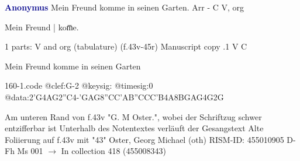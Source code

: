 \documentclass[twocolumn]{book}
\begin{document}
\newline \par \vspace{7pt} \textcolor{darkblue}{\textbf{Anonymus  }}
\newline Mein Freund komme in seinen Garten. Arr - C
\newline V, org
\newline \begin{itshape}[f.43v, at left:] Mein Freund | kom̅e.\end{itshape} 
\newline \textcolor{darkblue}{}  1 parts: V and org (tabulature)  (f.43v-45r)
\newline Manuscript copy
.1  V  C
\newline \begin{footnotesize} Mein Freund komme in seinen Garten \end{footnotesize}  
\begin{filecontents*}{160-1.code}
@clef:G-2
@keysig:
@timesig:0
@data:2'G4AG2''C4-'GAG{8''CC'AB}{''CCC'B}4A{8BG}{AG}4G2G
\end{filecontents*}
\newline
%

\newline Am unteren Rand von f.43v "G. M Oster.", wobei der Schriftzug schwer entzifferbar ist
\newline Unterhalb des Notentextes verläuft der Gesangstext
\newline Alte Foliierung auf f.43v mit "43"
\newline Oster, Georg Michael  (oth)
\newline RISM-ID: 455010905
\newline D-Fh  Ms 001
\newline $\rightarrow$ In collection 418 (455008343)
      
\end{document}
